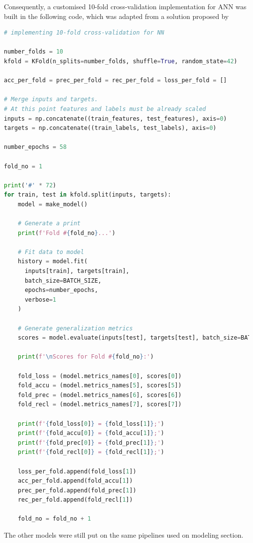 \documentclass{article}
\begin{document}
Consequently, a customised 10-fold cross-validation implementation for ANN was built in the following code, which was adapted from a solution proposed by \textcite{christianversloot_2022}

\begin{lstlisting}[language=Python]
# implementing 10-fold cross-validation for NN

number_folds = 10
kfold = KFold(n_splits=number_folds, shuffle=True, random_state=42)

acc_per_fold = prec_per_fold = rec_per_fold = loss_per_fold = []

# Merge inputs and targets. 
# At this point features and labels must be already scaled
inputs = np.concatenate((train_features, test_features), axis=0)
targets = np.concatenate((train_labels, test_labels), axis=0)

number_epochs = 58

fold_no = 1

print('#' * 72)
for train, test in kfold.split(inputs, targets):
    model = make_model()

    # Generate a print
    print(f'Fold #{fold_no}...')

    # Fit data to model
    history = model.fit(
      inputs[train], targets[train],
      batch_size=BATCH_SIZE,
      epochs=number_epochs,
      verbose=1
    )

    # Generate generalization metrics
    scores = model.evaluate(inputs[test], targets[test], batch_size=BATCH_SIZE, verbose=0)
    
    print(f'\nScores for Fold #{fold_no}:') 
    
    fold_loss = (model.metrics_names[0], scores[0])
    fold_accu = (model.metrics_names[5], scores[5])
    fold_prec = (model.metrics_names[6], scores[6])
    fold_recl = (model.metrics_names[7], scores[7])
    
    print(f'{fold_loss[0]} = {fold_loss[1]};')
    print(f'{fold_accu[0]} = {fold_accu[1]};')
    print(f'{fold_prec[0]} = {fold_prec[1]};')
    print(f'{fold_recl[0]} = {fold_recl[1]};')

    loss_per_fold.append(fold_loss[1])
    acc_per_fold.append(fold_accu[1])
    prec_per_fold.append(fold_prec[1])
    rec_per_fold.append(fold_recl[1])

    fold_no = fold_no + 1
\end{lstlisting}

The other models were still put on the same pipelines used on modeling section.
\end{document}
